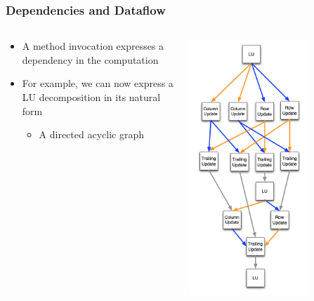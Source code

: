 \begin{frame}[fragile]
  \frametitle{Dependencies and Dataflow}
    \begin{columns}
    \begin{column}{0.55\textwidth}
      \begin{itemize}
      \item A method invocation expresses a dependency in the computation
      \item For example, we can now express a LU decomposition in its natural
        form
        \begin{itemize}
        \item A directed acyclic graph
        \end{itemize}
      \end{itemize}
    \end{column}
    \begin{column}{0.45\textwidth}
      \includegraphics[width=0.7\textwidth]{figures/ludag.png}
    \end{column}
  \end{columns}
\end{frame}